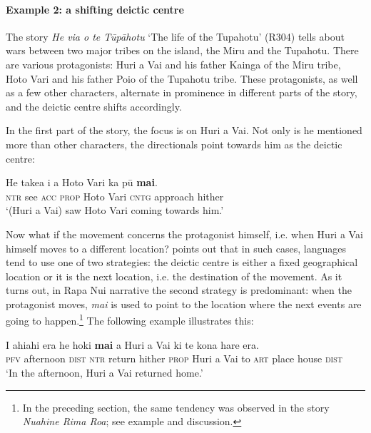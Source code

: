 \paragraph{Example 2: a shifting deictic centre}\label{sec:7.5.1.2.2}

The story \textit{He via o te Tūpāhotu} ‘The life of the Tupahotu’ (R304) tells about wars between two major tribes on the island, the Miru and the Tupahotu. There are various protagonists: Huri a Vai and his father Kainga of the Miru tribe, Hoto Vari and his father Poio of the Tupahotu tribe. These protagonists, as well as a few other characters, alternate in prominence in different parts of the story, and the deictic centre shifts accordingly.

In the first part of the story, the focus is on Huri a Vai. Not only is he mentioned more than other characters, the directionals point towards him as the deictic centre:

\ea\label{ex:7.137}
\gll He take{\ꞌ}a i a Hoto Vari ka pū \textbf{mai}. \\
\textsc{ntr} see \textsc{acc} \textsc{prop} Hoto Vari \textsc{cntg} approach hither \\

\glt
‘(Huri a Vai) saw Hoto Vari coming towards him.’ \textstyleExampleref{[R304.004]} 
\z

Now what if the movement concerns the protagonist himself, i.e. when Huri a Vai himself moves to a different location? \citet[142–143]{Levinsohn2007} points out that in such cases, languages tend to use one of two strategies: the deictic centre is either a fixed geographical location or it is the next location, i.e. the destination of the movement. As it turns out, in Rapa Nui narrative the second strategy is predominant: when the protagonist moves, \textit{mai} is used to point to the location where the next events are going to happen.\footnote{\label{fn:355}In the preceding section, the same tendency was observed in the story \textit{Nuahine Rima Roa}; see example  and discussion.} The following example illustrates this:

\ea\label{ex:7.138}
\gll I ahiahi era he hoki \textbf{mai} a Huri {\ꞌ}a Vai ki te kona hare era. \\
\textsc{pfv} afternoon \textsc{dist} \textsc{ntr} return hither \textsc{prop} Huri a Vai to \textsc{art} place house \textsc{dist} \\

\glt
‘In the afternoon, Huri a Vai returned home.’ \textstyleExampleref{[R304.009]} 
\z

